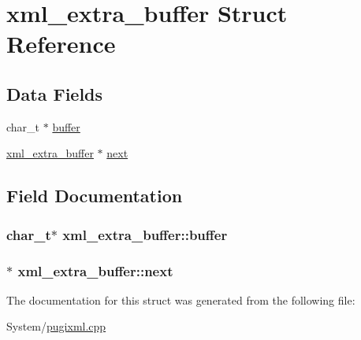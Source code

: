 \hypertarget{structxml__extra__buffer}{\section{xml\-\_\-extra\-\_\-buffer Struct Reference}
\label{structxml__extra__buffer}
}
\subsection*{Data Fields}
\begin{DoxyCompactItemize}
\item 
char\-\_\-t $\ast$ \hyperlink{structxml__extra__buffer_ab24b191b25f92ad4d48009978ebee38c}{buffer}
\item 
\hyperlink{structxml__extra__buffer}{xml\-\_\-extra\-\_\-buffer} $\ast$ \hyperlink{structxml__extra__buffer_a8aaafa90868ca4d8e06b21eeabd96183}{next}
\end{DoxyCompactItemize}


\subsection{Field Documentation}
\hypertarget{structxml__extra__buffer_ab24b191b25f92ad4d48009978ebee38c}{
\subsubsection[{buffer}]{\setlength{\rightskip}{0pt plus 5cm}char\-\_\-t$\ast$ xml\-\_\-extra\-\_\-buffer\-::buffer}}\label{structxml__extra__buffer_ab24b191b25f92ad4d48009978ebee38c}
\hypertarget{structxml__extra__buffer_a8aaafa90868ca4d8e06b21eeabd96183}{
\subsubsection[{next}]{$\ast$ xml\-\_\-extra\-\_\-buffer\-::next}}\label{structxml__extra__buffer_a8aaafa90868ca4d8e06b21eeabd96183}


The documentation for this struct was generated from the following file\-:\begin{DoxyCompactItemize}
\item 
System/\hyperlink{pugixml_8cpp}{pugixml.\-cpp}\end{DoxyCompactItemize}
